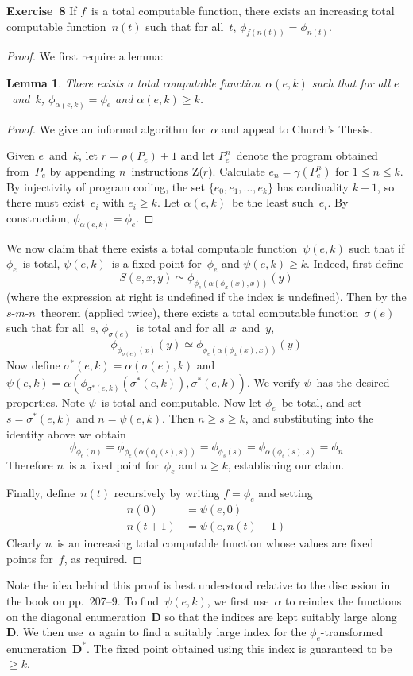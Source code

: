 \documentclass[letterpaper]{article}
\newcommand{\exercise}[2][]{\noindent\textbf{Exercise~{#2}}\ifthenelse{\isempty{#1}}{\textbf{.}}{ ({#1})\textbf{.}}}
\newcommand{\smn}{$s$-$m$-$n$}
\theoremstyle{plain}
\newtheorem*{lem}{Lemma}
\theoremstyle{definition}
\theoremstyle{remark}
\begin{document}
\exercise[Recursion theorem]{8}
If $f$~is a total computable function, there exists an increasing total computable function~$n(t)$ such that for all~$t$, $\phi_{f(n(t))}=\phi_{n(t)}$.
\begin{proof}
We first require a lemma:
\begin{lem}
There exists a total computable function~$\alpha(e,k)$ such that for all $e$~and~$k$, $\phi_{\alpha(e,k)}=\phi_e$ and $\alpha(e,k)\ge k$.
\end{lem}
\begin{proof}
We give an informal algorithm for~$\alpha$ and appeal to Church's Thesis.

Given $e$~and~$k$, let $r=\rho(P_e)+1$ and let $P_e^n$~denote the program obtained from~$P_e$ by appending $n$~instructions Z($r$). Calculate $e_n=\gamma(P_e^n)$ for $1\le n\le k$. By injectivity of program coding, the set $\{e_0,e_1,\ldots,e_k\}$ has cardinality $k+1$, so there must exist~$e_i$ with $e_i\ge k$. Let $\alpha(e,k)$~be the least such~$e_i$. By construction, $\phi_{\alpha(e,k)}=\phi_e$.
\end{proof}

\noindent We now claim that there exists a total computable function~$\psi(e,k)$ such that if $\phi_e$~is total, $\psi(e,k)$~is a fixed point for~$\phi_e$ and $\psi(e,k)\ge k$. Indeed, first define
$$S(e,x,y)\simeq\phi_{\phi_e(\alpha(\phi_x(x),x))}(y)$$
(where the expression at right is undefined if the index is undefined). Then by the \smn\ theorem (applied twice), there exists a total computable function~$\sigma(e)$ such that for all~$e$, $\phi_{\sigma(e)}$~is total and for all~$x$~and~$y$,
$$\phi_{\phi_{\sigma(e)}(x)}(y)\simeq\phi_{\phi_e(\alpha(\phi_x(x),x))}(y)$$
Now define $\sigma^*(e,k)=\alpha(\sigma(e),k)$ and $\psi(e,k)=\alpha(\phi_{\sigma^*(e,k)}(\sigma^*(e,k)),\sigma^*(e,k))$. We verify $\psi$~has the desired properties. Note $\psi$~is total and computable. Now let $\phi_e$~be total, and set $s=\sigma^*(e,k)$ and $n=\psi(e,k)$. Then $n\ge s\ge k$, and substituting into the identity above we obtain
$$\phi_{\phi_e(n)}=\phi_{\phi_e(\alpha(\phi_s(s),s))}=\phi_{\phi_s(s)}=\phi_{\alpha(\phi_s(s),s)}=\phi_n$$
Therefore $n$~is a fixed point for~$\phi_e$ and $n\ge k$, establishing our claim.

Finally, define~$n(t)$ recursively by writing $f=\phi_e$ and setting
\begin{align*}
n(0)&=\psi(e,0)\\
n(t+1)&=\psi(e,n(t)+1)
\end{align*}
Clearly $n$~is an increasing total computable function whose values are fixed points for~$f$, as required.
\end{proof}
\noindent Note the idea behind this proof is best understood relative to the discussion in the book on pp.~207--9. To find~$\psi(e,k)$, we first use~$\alpha$ to reindex the functions on the diagonal enumeration~$\mathbf{D}$ so that the indices are kept suitably large along~$\mathbf{D}$. We then use~$\alpha$ again to find a suitably large index for the $\phi_e$-transformed enumeration~$\mathbf{D}^*$. The fixed point obtained using this index is guaranteed to be~$\ge k$.
\end{document}
